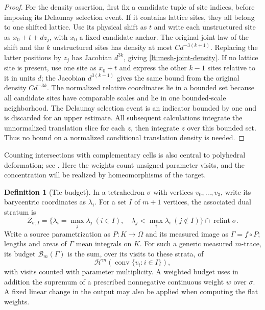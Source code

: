 \documentclass[11pt]{article}
\numberwithin{equation}{section}
\theoremstyle{definition}
\newtheorem{definition}[theorem]{Definition}
\theoremstyle{remark}
\begin{document}
\begin{proof}
For the density assertion, first fix a candidate tuple of site
indices, before imposing its Delaunay selection event.  If it contains
lattice sites, they all belong to one shifted lattice.  Use its
physical shift as $t$ and write each unstructured site as
$x_0+t+dz_j$, with $x_0$ a fixed candidate anchor.  The original
joint law of the shift and the $k$ unstructured sites has density
at most $Cd^{-3(k+1)}$.  Replacing the latter positions by $z_j$
has Jacobian $d^{3k}$, giving \eqref{lt:mesh-joint-density}.
If no lattice site is present, use one site as $x_0+t$ and express
the other $k-1$ sites relative to it in units $d$; the Jacobian
$d^{3(k-1)}$ gives the same bound from the original density
$Cd^{-3k}$.  The normalized relative coordinates lie in a bounded
set because all candidate sites have comparable scales and lie in
one bounded-scale neighborhood.  The Delaunay selection event is
an indicator bounded by one and is discarded for an upper estimate.
All subsequent calculations integrate the unnormalized translation
slice for each $z$, then integrate $z$ over this bounded set.  Thus
no bound on a normalized conditional translation density is needed.
\end{proof}

Counting intersections with complementary cells is also central to
polyhedral deformation; see \cite[Proposition~2.2]{White1999}. Here
the weights count unsigned parameter visits, and the concentration
will be realized by homeomorphisms of the target.

\begin{definition}[Tie budget]
\label{lt:tie-budget}
In a tetrahedron $\sigma$ with vertices $v_0,\ldots,v_3$, write its
barycentric coordinates as $\lambda_i$.  For a set $I$ of $m+1$
vertices, the associated dual stratum is
\[
 Z_{\sigma,I}=
 \{\lambda_i=\max_j\lambda_j\ (i\in I),\quad
           \lambda_j<\max_i\lambda_i\ (j\notin I)\}
          \cap\operatorname{relint}\sigma.
\]
Write a source parametrization as $P:K\to\Omega$ and its measured
image as $\Gamma=f\circ P$; lengths and areas of $\Gamma$ mean
integrals on $K$.  For such a generic measured $m$-trace, its budget
$\mathcal B_m(\Gamma)$ is the sum, over its visits to these strata, of
\[
 \mathcal H^m(\operatorname{conv}\{v_i:i\in I\}),
\]
with visits counted with parameter multiplicity.  A weighted budget
uses in addition the supremum of a prescribed nonnegative continuous
weight $w$ over $\sigma$.  A fixed linear change in the output may
also be applied when computing the flat weights.
\end{definition}
\end{document}
